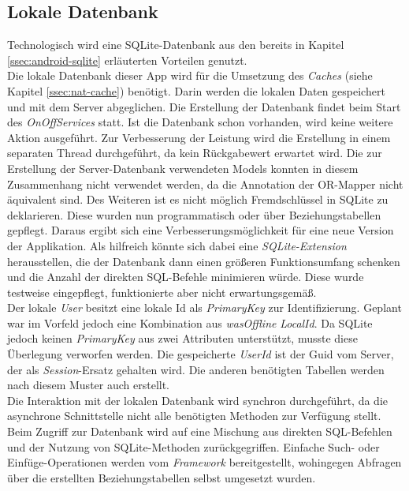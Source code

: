 \subsection{Lokale Datenbank}
\label{ssec:nat-db}
Technologisch wird eine SQLite-Datenbank aus den bereits in Kapitel \ref{ssec:android-sqlite} erläuterten Vorteilen genutzt.\\
Die lokale Datenbank dieser App wird für die Umsetzung des \textit{Caches} (siehe Kapitel \ref{ssec:nat-cache}) benötigt. Darin werden die lokalen Daten gespeichert und mit dem Server abgeglichen.
Die Erstellung der Datenbank findet beim Start des \textit{OnOffServices} statt. Ist die Datenbank schon vorhanden, wird keine weitere Aktion ausgeführt. Zur Verbesserung der Leistung wird die Erstellung in einem separaten Thread durchgeführt, da kein Rückgabewert erwartet wird. Die zur Erstellung der Server-Datenbank verwendeten Models konnten in diesem Zusammenhang nicht verwendet werden, da die Annotation der OR-Mapper nicht äquivalent sind. Des Weiteren ist es nicht möglich Fremdschlüssel in SQLite zu deklarieren. Diese wurden nun programmatisch oder über Beziehungstabellen gepflegt. Daraus ergibt sich eine Verbesserungsmöglichkeit für eine neue Version der Applikation. Als hilfreich könnte sich dabei eine \textit{SQLite-Extension} herausstellen, die der Datenbank dann einen größeren Funktionsumfang schenken und die Anzahl der direkten SQL-Befehle minimieren würde. Diese wurde testweise eingepflegt, funktionierte aber nicht erwartungsgemäß.\\

Der lokale \textit{User} besitzt eine lokale Id als \textit{PrimaryKey} zur Identifizierung. Geplant war im Vorfeld jedoch eine Kombination aus \textit{wasOffline} \textit{LocalId}. Da SQLite jedoch keinen \textit{PrimaryKey} aus zwei Attributen unterstützt, musste diese Überlegung verworfen werden. Die gespeicherte \textit{UserId} ist der Guid vom Server, der als \textit{Session}-Ersatz gehalten wird. Die anderen benötigten Tabellen werden nach diesem Muster auch erstellt.\\
Die Interaktion mit der lokalen Datenbank wird synchron durchgeführt, da die asynchrone Schnittstelle nicht alle benötigten Methoden zur Verfügung stellt. Beim Zugriff zur Datenbank wird auf eine Mischung aus direkten SQL-Befehlen und der Nutzung von SQLite-Methoden zurückgegriffen. Einfache Such- oder Einfüge-Operationen werden vom \textit{Framework} bereitgestellt, wohingegen Abfragen über die erstellten Beziehungstabellen selbst umgesetzt wurden.
